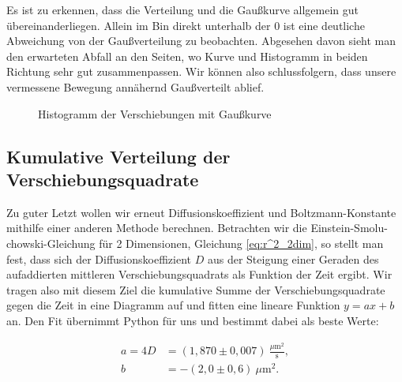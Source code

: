 \documentclass{article}
\begin{document}
Es ist zu erkennen, dass die Verteilung und die Gaußkurve allgemein gut übereinanderliegen. Allein im Bin direkt unterhalb der 0 ist eine deutliche Abweichung von der Gaußverteilung zu beobachten. Abgesehen davon sieht man den erwarteten Abfall an den Seiten, wo Kurve und Histogramm in beiden Richtung sehr gut zusammenpassen. Wir können also schlussfolgern, dass unsere vermessene Bewegung annähernd Gaußverteilt ablief.

\begin{figure}[!hp]
    \centering
    \caption{Histogramm der Verschiebungen mit Gaußkurve}
    \label{fig:brown2}
\end{figure}


\clearpage
\newpage
\subsection{Kumulative Verteilung der Verschiebungsquadrate}

Zu guter Letzt wollen wir erneut Diffusionskoeffizient und Boltzmann-Konstante mithilfe einer anderen Methode berechnen. Betrachten wir die Einstein-Smolu-chowski-Gleichung für 2 Dimensionen, Gleichung \ref{eq:r^2_2dim}, so stellt man fest, dass sich der Diffusionskoeffizient $D$ aus der Steigung einer Geraden des aufaddierten mittleren Verschiebungsquadrats als Funktion der Zeit ergibt. Wir tragen also mit diesem Ziel die kumulative Summe der Verschiebungsquadrate gegen die Zeit in eine Diagramm auf und fitten eine lineare Funktion $y = ax+b$ an. Den Fit übernimmt Python für uns und bestimmt dabei als beste Werte:

\begin{equation}
    \begin{split}
        a = 4D &= (1,870 \pm 0,007) \ \frac{\mu \text{m}^2}{\text{s}}, \\
        b &= -(2,0 \pm 0,6) \ \mu \text{m}^2.
    \end{split}
\end{equation}
\end{document}

